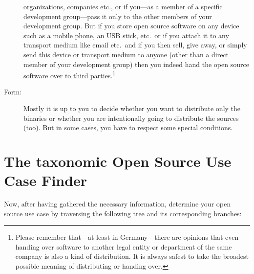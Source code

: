 \begin{description}
organizations, companies etc., or if you---as a member of a specific
development group---pass it only to the other members of your development
group. But if you store open source software on any device such as a mobile
phone, an USB stick, etc.\ or if you attach it to any transport medium like
email etc.\ and if you then sell, give away, or simply send this device or
transport medium to anyone (other than a direct member of your development
group) then you indeed hand the open source software over to third
parties.\footnote{Please remember that---at least in Germany---there are
opinions that even handing over software to another legal entity or department
of the same company is also a kind of distribution. It is always safest to take
the broadest possible meaning of distributing or handing over.}
\item[Form:] Mostly it is up to you to decide whether you want to distribute
only the binaries or whether you are intentionally going to distribute the
sources (too). But in some cases, you have to respect some special
conditions.
\end{description}

\section{The taxonomic Open Source Use Case Finder}

Now, after having gathered the necessary information, determine your 
open source use case by traversing the following tree and its corresponding
branches:

